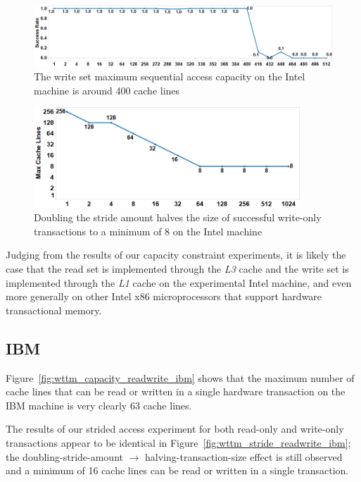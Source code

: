 \documentclass{article}
\begin{document}
\begin{figure}[]%
\centering
{}
\includegraphics[width=\linewidth]{images/wttm_capacity_write_intel}
\caption{The write set maximum sequential access capacity on the Intel machine is
around 400 cache lines}
\label{fig:wttm_capacity_write_intel}
\end{figure}

\begin{figure}[]%
\centering
{}
\includegraphics[width=100mm]{images/wttm_stride_write_intel}
\caption{Doubling the stride amount halves the size of successful write-only
transactions to a minimum of 8 on the Intel machine}
\label{fig:wttm_stride_write_intel}
\end{figure}

Judging from the results of our capacity constraint experiments, it is likely
the case that the read set is implemented through the \textit{L3} cache and the
write set is implemented through the \textit{L1} cache on the experimental Intel
machine, and even more generally on other Intel x86 microprocessors that support
hardware transactional memory.

\subsection*{IBM}

Figure~\ref{fig:wttm_capacity_readwrite_ibm} shows that the maximum number of
cache lines that can be read or written in a single hardware transaction on the
IBM machine is very clearly 63 cache lines.

The results of our strided access experiment for both read-only and write-only
transactions appear to be identical in
Figure~\ref{fig:wttm_stride_readwrite_ibm}; the doubling-stride-amount
$\rightarrow$ halving-transaction-size effect is still observed and a minimum of
16 cache lines can be read or written in a single transaction.
\end{document}
